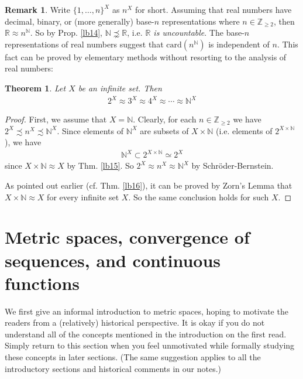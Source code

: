 \documentclass[12pt,b5paper,notitlepage]{article}
\theoremstyle{definition}
\newtheorem{rem}[df]{Remark}
\theoremstyle{plain}
\newtheorem{thm}[df]{Theorem}
\newcommand{\Nbb}{\mathbb N}
\newcommand{\Zbb}{\mathbb Z}
\newcommand{\Rbb}{\mathbb R}
\newcommand{\card}{\mathrm{card}}
\numberwithin{equation}{section}
\begin{document}
\begin{rem}
Write $\{1,\dots,n\}^X$ as $n^X$ for short.  Assuming that real numbers have decimal, binary, or (more generally) base-$n$ representations where $n\in\Zbb_{\geq 2}$, then  $\Rbb\approx n^{\Nbb}$. So by Prop. \ref{lb14}, $\Nbb\precnsim\Rbb$, i.e. \emph{$\Rbb$ is uncountable}. The base-$n$ representations of real numbers suggest that $\card(n^\Nbb)$ is independent of $n$. This fact can be proved by elementary methods without  resorting to the analysis of real numbers:
\end{rem}

\begin{thm}
Let $X$ be an infinite set. Then
\begin{align*}
2^X\approx 3^X\approx 4^X\approx\cdots\approx \Nbb^X
\end{align*}
\end{thm}

\begin{proof}
First, we assume that $X=\Nbb$. Clearly, for each $n\in\Zbb_{\geq 2}$ we have $2^X\precsim n^X\precsim \Nbb^X$. Since elements of $\Nbb^X$ are subsets of $X\times\Nbb$ (i.e. elements of $2^{X\times\Nbb}$), we have
\begin{align*}
\Nbb^X\subset 2^{X\times\Nbb}\simeq 2^X
\end{align*}
since $X\times\Nbb\approx X$ by Thm. \ref{lb15}. So $2^X\approx n^X\approx \Nbb^X$ by Schr\"oder-Bernstein.

As pointed out earlier (cf. Thm. \ref{lb16}), it can be proved by Zorn's Lemma that $X\times\Nbb\approx X$ for every infinite set $X$. So the same conclusion holds for such $X$.
\end{proof}

\newpage

\section{Metric spaces, convergence of sequences, and continuous functions}


We first give an informal introduction to metric spaces, hoping to motivate the readers from a (relatively) historical perspective. It is okay if you do not understand all of the concepts mentioned in the introduction on the first read. Simply return to this section when you feel unmotivated while formally studying these concepts in later sections. (The same suggestion applies to all the introductory sections and historical comments in our notes.)
\end{document}
